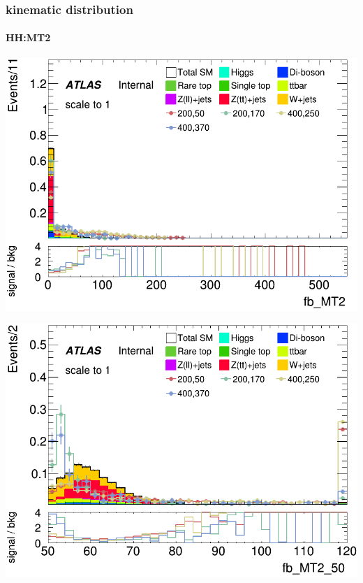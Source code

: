 \documentclass[usenames,dvipsnames]{beamer}
\begin{document}
\begin{frame}
\frametitle{kinematic distribution}
\framesubtitle{HH:MT2}
    \begin{minipage}{0.32\textwidth}
        \centering
        \includegraphics[width=\textwidth]{graphics/HH_met_sig/HH_fb_MT2_norm.png}
    \end{minipage}
    \hfill
    \begin{minipage}{0.32\textwidth}
        \centering
        \includegraphics[width=\textwidth]{graphics/HH_met_sig/HH_fb_MT2_50_norm.png}
    \end{minipage}
    \hfill
    \begin{minipage}{0.32\textwidth}
        \centering

\end{minipage}
\end{frame}
\end{document}
